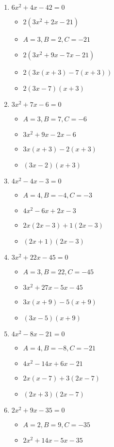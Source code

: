 \documentclass{article}
\begin{document}
\begin{enumerate}
\item $6x^{2} + 4x - 42 = 0$
  \begin{itemize}
  \item $2(3x^{2}+2x-21)$
  \item $A=3, B=2, C=-21$
  \item $2(3x^{2}+9x-7x-21)$
  \item $2(3x(x+3)-7(x+3))$
  \item $2(3x-7)(x+3)$
  \end{itemize}
\item $3x^{2} + 7x - 6 = 0$
  \begin{itemize}
  \item $A=3, B=7, C=-6$
  \item $3x^{2}+9x-2x-6$
  \item $3x(x+3)-2(x+3)$
  \item $(3x-2)(x+3)$
  \end{itemize}
\item $4x^{2} - 4x - 3 = 0$
  \begin{itemize}
  \item $A=4, B=-4, C=-3$
  \item $4x^{2}-6x+2x-3$
  \item $2x(2x-3)+1(2x-3)$
  \item $(2x+1)(2x-3)$
  \end{itemize}
\item $3x^{2} + 22x - 45 = 0$
  \begin{itemize}
  \item $A=3, B=22, C=-45$
  \item $3x^{2}+27x-5x-45$
  \item $3x(x+9)-5(x+9)$
  \item $(3x-5)(x+9)$
  \end{itemize}
\item $4x^{2} - 8x - 21 = 0$
  \begin{itemize}
  \item $A=4, B=-8, C=-21$
  \item $4x^{2}-14x+6x-21$
  \item $2x(x-7)+3(2x-7)$
  \item $(2x+3)(2x-7)$
  \end{itemize}
\item $2x^{2} + 9x - 35 =0$
  \begin{itemize}
  \item $A=2, B=9, C=-35$
  \item $2x^{2}+14x-5x-35$

\end{itemize}
\end{enumerate}
\end{document}
